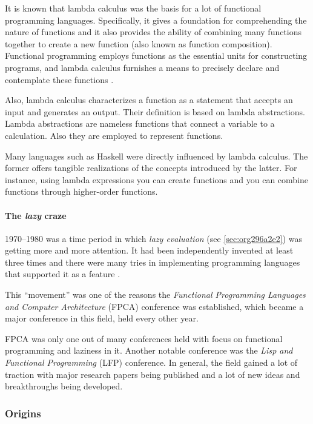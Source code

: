 \documentclass[a4paper, titlepage, twoside]{article}
\begin{document}
It is known that lambda calculus was the basis for a lot of functional programming languages. Specifically, it gives a foundation for comprehending the nature of functions and it also provides the ability of combining many functions together to create a new function (also known as function composition). Functional programming employs functions as the essential units for constructing programs, and lambda calculus furnishes a means to precisely declare and contemplate these functions \autocite{pandaquestsRelationshipLambdaCalculus2023}.

Also, lambda calculus characterizes a function as a statement that accepts an input and generates an output. Their definition is based on lambda abstractions. Lambda abstractions are nameless functions that connect a variable to a calculation. Also they are employed to represent functions. 

Many languages such as Haskell were directly influenced by lambda calculus. The former offers tangible realizations of the concepts introduced by the latter. For instance, using lambda expressions you can create functions and you can combine functions through higher-order functions.

\paragraph*{The \emph{lazy} craze}
\label{sec:org79d32a4}

1970--1980 was a time period in which \emph{lazy evaluation} (see \ref{sec:org296a2e2}) was getting more and more attention. It had been independently invented at least three times and there were many tries in implementing programming languages that supported it as a feature \autocite{hudakHistoryHaskellBeing2007}.

This ``movement'' was one of the reasons the \emph{Functional Programming Languages and Computer Architecture} (FPCA) conference was established, which became a major conference in this field, held every other year.

FPCA was only one out of many conferences held with focus on functional programming and laziness in it. Another notable conference was the \emph{Lisp and Functional Programming} (LFP) conference. In general, the field gained a lot of traction with major research papers being published and a lot of new ideas and breakthroughs being developed.

\subsubsection{Origins}
\label{sec:orga5ec049}
\end{document}
